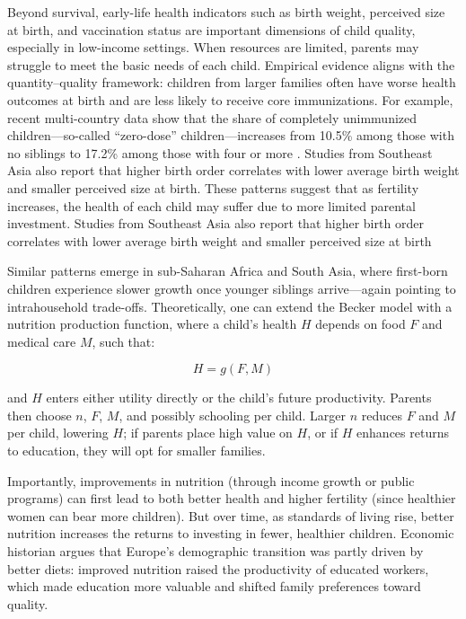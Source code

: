 \documentclass[]{AEA}
\begin{document}
Beyond survival, early-life health indicators such as birth weight,
perceived size at birth, and vaccination status are important dimensions
of child quality, especially in low-income settings. When resources are
limited, parents may struggle to meet the basic needs of each child.
Empirical evidence aligns with the quantity--quality framework: children
from larger families often have worse health outcomes at birth and are
less likely to receive core immunizations. For example, recent
multi-country data show that the share of completely unimmunized
children---so-called ``zero-dose'' children---increases from 10.5\%
among those with no siblings to 17.2\% among those with four or more
\citep{costa2024child}. Studies from Southeast Asia also report that
higher birth order correlates with lower average birth weight and
smaller perceived size at birth. These patterns suggest that as
fertility increases, the health of each child may suffer due to more
limited parental investment. Studies from Southeast Asia
\citep{chen2021population} also report that higher birth order
correlates with lower average birth weight and smaller perceived size at
birth

Similar patterns emerge in sub-Saharan Africa
\citep{bishwakarma2019first} and South Asia, where first-born children
experience slower growth once younger siblings arrive---again pointing
to intrahousehold trade-offs. Theoretically, one can extend the Becker
model with a nutrition production function, where a child's health \(H\)
depends on food \(F\) and medical care \(M\), such that:

\[
H = g(F, M)
\]

and \(H\) enters either utility directly or the child's future
productivity. Parents then choose \(n\), \(F\), \(M\), and possibly
schooling per child. Larger \(n\) reduces \(F\) and \(M\) per child,
lowering \(H\); if parents place high value on \(H\), or if \(H\)
enhances returns to education, they will opt for smaller families.

Importantly, improvements in nutrition (through income growth or public
programs) can first lead to both better health and higher fertility
(since healthier women can bear more children). But over time, as
standards of living rise, better nutrition increases the returns to
investing in fewer, healthier children. Economic historian
\citet{fogel1994economic} argues that Europe's demographic transition
was partly driven by better diets: improved nutrition raised the
productivity of educated workers, which made education more valuable and
shifted family preferences toward quality.
\end{document}
